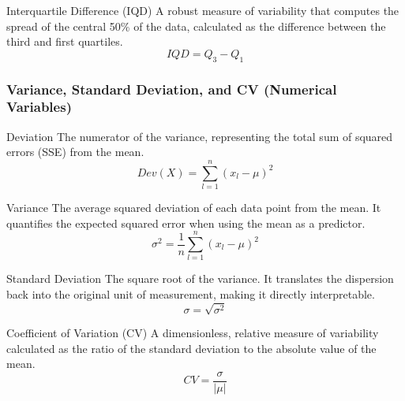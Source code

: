 \begin{defbox}{Interquartile Difference (IQD)}
A robust measure of variability that computes the spread of the central 50\% of the data, calculated as the difference between the third and first quartiles.
\begin{equation}
    IQD = Q_3 - Q_1
\end{equation}
\end{defbox}

\subsubsection{Variance, Standard Deviation, and CV (Numerical Variables)}

\begin{defbox}{Deviation}
The numerator of the variance, representing the total sum of squared errors (SSE) from the mean.
\begin{equation}
    Dev(X) = \sum_{l=1}^{n} (x_l - \mu)^2
\end{equation}
\end{defbox}

\begin{defbox}{Variance}
The average squared deviation of each data point from the mean. It quantifies the expected squared error when using the mean as a predictor.
\begin{equation}
    \sigma^2 = \frac{1}{n} \sum_{l=1}^{n} (x_l - \mu)^2
\end{equation}
\end{defbox}

\begin{defbox}{Standard Deviation}
The square root of the variance. It translates the dispersion back into the original unit of measurement, making it directly interpretable.
\begin{equation}
    \sigma = \sqrt{\sigma^2}
\end{equation}
\end{defbox}

\begin{defbox}{Coefficient of Variation (CV)}
A dimensionless, relative measure of variability calculated as the ratio of the standard deviation to the absolute value of the mean.
\begin{equation}
    CV = \frac{\sigma}{|\mu|}
\end{equation}
\end{defbox}

